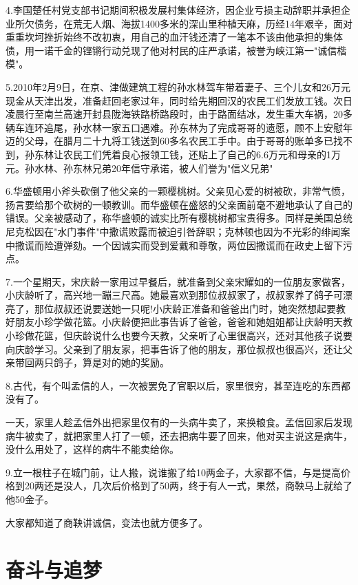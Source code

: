 \documentclass[UTF8]{ctexart}
\begin{document}
4.李国楚任村党支部书记期间积极发展村集体经济，因企业亏损主动辞职并承担企业所欠债务，在荒无人烟、海拔1400多米的深山里种植天麻，历经14年艰辛，面对重重坎坷挫折始终不改初衷，用自己的血汗钱还清了一笔本不该由他承担的集体债，用一诺千金的铿锵行动兑现了他对村民的庄严承诺，被誉为峡江第一"诚信楷模"。\par
5.2010年2月9日，在京、津做建筑工程的孙水林驾车带着妻子、三个儿女和26万元现金从天津出发，准备赶回老家过年，同时给先期回汉的农民工们发放工钱。次日凌晨行至南兰高速开封县陇海铁路桥路段时，由于路面结冰，发生重大车祸，20多辆车连环追尾，孙水林一家五口遇难。孙东林为了完成哥哥的遗愿，顾不上安慰年迈的父母，在腊月二十九将工钱送到60多名农民工手中。由于哥哥的账单多已找不到，孙东林让农民工们凭着良心报领工钱，还贴上了自己的6.6万元和母亲的1万元。孙水林、孙东林兄弟20年信守承诺，被人们誉为"信义兄弟"\par
6.华盛顿用小斧头砍倒了他父亲的一颗樱桃树。父亲见心爱的树被砍，非常气愤，扬言要给那个砍树的一顿教训。而华盛顿在盛怒的父亲面前毫不避地承认了自己的错误。父亲被感动了，称华盛顿的诚实比所有樱桃树都宝贵得多。同样是美国总统尼克松因在"水门事件"中撒谎败露而被迫引咎辞职；克林顿也因为不光彩的绯闻案中撒谎而险遭弹劾。一个因诚实而受到爱戴和尊敬，两位因撒谎而在政史上留下污点。\par
7.一个星期天，宋庆龄一家用过早餐后，就准备到父亲宋耀如的一位朋友家做客，小庆龄听了，高兴地一蹦三尺高。她最喜欢到那位叔叔家了，叔叔家养了鸽子可漂亮了，那位叔叔还说要送她一只呢!小庆龄正准备和爸爸出门时，她突然想起要教好朋友小珍学做花篮。小庆龄便把此事告诉了爸爸，爸爸和她姐姐都让庆龄明天教小珍做花篮，但庆龄说什么也要今天教，父亲听了心里很高兴，还对其他孩子说要向庆龄学习。父亲到了朋友家，把事告诉了他的朋友，那位叔叔也很高兴，还让父亲带回两只鸽子，算是对的她的奖励。\par
8.古代，有个叫孟信的人，一次被罢免了官职以后，家里很穷，甚至连吃的东西都没有了。\par
一天，家里人趁孟信外出把家里仅有的一头病牛卖了，来换粮食。孟信回家后发现病牛被卖了，就把家里人打了一顿，还去把病牛要了回来，他对买主说这是病牛，没什么用处了，这样的病牛不能卖给你。\par
9.立一根柱子在城门前，让人搬，说谁搬了给10两金子，大家都不信，与是提高价格到20两还是没人，几次后价格到了50两，终于有人一式，果然，商鞅马上就给了他50金子。\par
大家都知道了商鞅讲诚信，变法也就方便多了。\par
\newpage
\section{奋斗与追梦}
\end{document}
